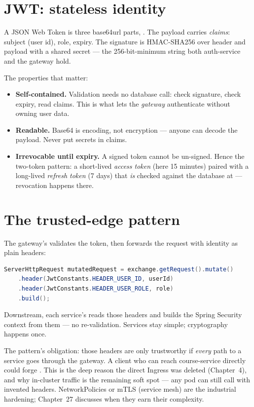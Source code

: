 \section{JWT: stateless identity}

A JSON Web Token is three base64url parts, .
The payload carries \emph{claims}: subject (user id), role, expiry. The
signature is HMAC-SHA256 over header and payload with a shared secret ---
the 256-bit-minimum string both auth-service and the gateway hold.

The properties that matter:

\begin{itemize}
  \item \textbf{Self-contained.} Validation needs no database call: check
  signature, check expiry, read claims. This is what lets the
  \emph{gateway} authenticate without owning user data.
  \item \textbf{Readable.} Base64 is encoding, not encryption --- anyone
  can decode the payload. Never put secrets in claims.
  \item \textbf{Irrevocable until expiry.} A signed token cannot be
  un-signed. Hence the two-token pattern: a short-lived \emph{access
  token} (here 15 minutes) paired with a long-lived \emph{refresh token}
  (7 days) that \emph{is} checked against the database at
   --- revocation happens there.
\end{itemize}

\section{The trusted-edge pattern}
\label{sec:trusted-edge}

The gateway's  validates the token, then
forwards the request with identity as plain headers:

\begin{lstlisting}[language=Java]
ServerHttpRequest mutatedRequest = exchange.getRequest().mutate()
    .header(JwtConstants.HEADER_USER_ID, userId)
    .header(JwtConstants.HEADER_USER_ROLE, role)
    .build();
\end{lstlisting}

Downstream, each service's  reads those
headers and builds the Spring Security context from them --- no
re-validation. Services stay simple; cryptography happens once.

The pattern's obligation: those headers are only trustworthy if
\emph{every} path to a service goes through the gateway. A client who can
reach course-service directly could forge . This is the
deep reason the direct  Ingress was deleted (Chapter~4),
and why in-cluster traffic is the remaining soft spot --- any pod can
still call  with invented headers.
NetworkPolicies or mTLS (service mesh) are the industrial hardening;
Chapter~27 discusses when they earn their complexity.

